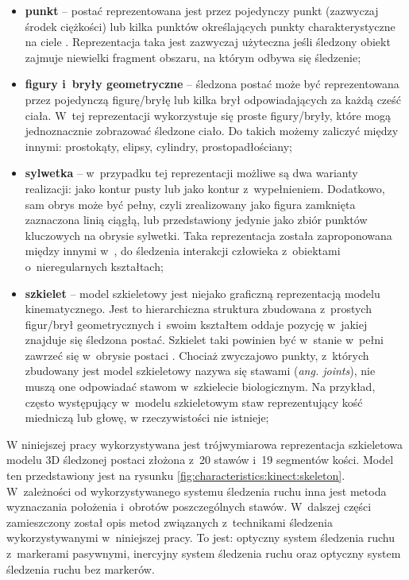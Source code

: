 \begin{itemize}
	\item \textbf{punkt} -- postać reprezentowana jest przez pojedynczy punkt (zazwyczaj środek ciężkości) \cite{Veenman2001} lub kilka punktów określających punkty charakterystyczne na ciele \cite{Serby2004}. Reprezentacja taka jest zazwyczaj użyteczna jeśli śledzony obiekt zajmuje niewielki fragment obszaru, na którym odbywa się śledzenie;
	\item \textbf{figury i~bryły geometryczne} -- śledzona postać może być reprezentowana przez pojedynczą figurę/bryłę \cite{Comaniciu2003} lub kilka brył odpowiadających za każdą cześć ciała. W~tej reprezentacji wykorzystuje się proste figury/bryły, które mogą jednoznacznie zobrazować śledzone ciało. Do takich możemy zaliczyć między innymi: prostokąty, elipsy, cylindry, prostopadłościany;
	\item \textbf{sylwetka} -- w~przypadku tej reprezentacji możliwe są dwa warianty realizacji: jako kontur pusty lub jako kontur z~wypełnieniem. Dodatkowo, sam obrys może być pełny, czyli zrealizowany jako figura zamknięta zaznaczona linią ciągłą, lub przedstawiony jedynie jako zbiór punktów kluczowych na obrysie sylwetki. Taka reprezentacja została zaproponowana między innymi w~\cite{Yilmaz2004}, do śledzenia interakcji człowieka z~obiektami o~nieregularnych kształtach;
	\item \textbf{szkielet} -- model szkieletowy jest niejako graficzną reprezentacją modelu kinematycznego. Jest to hierarchiczna struktura zbudowana z~prostych figur/brył geometrycznych i~swoim kształtem oddaje pozycję w~jakiej znajduje się śledzona postać. Szkielet taki powinien być w~stanie w~pełni zawrzeć się w~obrysie postaci \cite{Ali2001}. Chociaż zwyczajowo punkty, z~których zbudowany jest model szkieletowy nazywa się stawami (\emph{ang. joints}), nie muszą one odpowiadać stawom w~szkielecie biologicznym. Na przykład, często występujący w~modelu szkieletowym staw reprezentujący kość miedniczą lub głowę, w rzeczywistości nie istnieje;
\end{itemize}
															
W niniejszej pracy wykorzystywana jest trójwymiarowa reprezentacja szkieletowa modelu 3D śledzonej postaci złożona z~20 stawów i~19 segmentów kości. Model ten przedstawiony jest na rysunku \ref{fig:characteristics:kinect:skeleton}. W~zależności od wykorzystywanego systemu śledzenia ruchu inna jest metoda wyznaczania położenia i~obrotów poszczególnych stawów. W~dalszej części zamieszczony został opis metod związanych z~technikami śledzenia wykorzystywanymi w~niniejszej pracy. To jest: optyczny system śledzenia ruchu z~markerami pasywnymi, inercyjny system śledzenia ruchu oraz optyczny system śledzenia ruchu bez markerów.
																	
